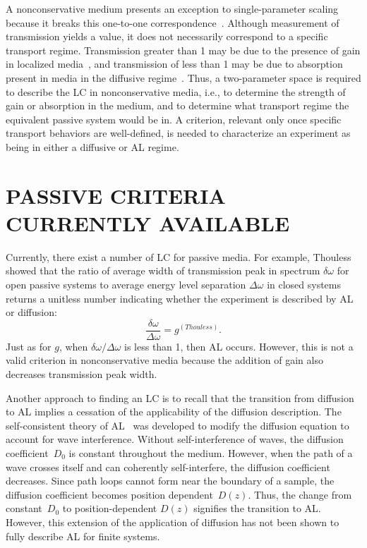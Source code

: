 A nonconservative medium presents an exception to single-parameter scaling because it breaks this one-to-one correspondence~\cite{1994_Freilikher_absorption}. Although measurement of transmission yields a value, it does not necessarily correspond to a specific transport regime. Transmission greater than 1 may be due to the presence of gain in localized media~\cite{2004_Yamilov_intensity,2006_Yamilov_conductance}, and transmission of less than 1 may be due to absorption present in media in the diffusive regime~\cite{2000_chabanov_nature,1998_Brouwer}. Thus, a two-parameter space is required to describe the LC in nonconservative media, i.e., to determine the strength of gain or absorption in the medium, and to determine what transport regime the equivalent passive system would be in. A criterion, relevant only once specific transport behaviors are well-defined, is needed to characterize an experiment as being in either a diffusive or AL regime. 

\section{PASSIVE CRITERIA CURRENTLY AVAILABLE}
\label{sec:passive_criteria}
Currently, there exist a number of LC for passive media. For example, Thouless~\cite{1977_Thouless} showed that the ratio of average width of transmission peak in spectrum $\delta \omega$ for open passive systems to average energy level separation $\Delta \omega$ in closed systems returns a unitless number indicating whether the experiment is described by AL or diffusion:
\begin{equation}
\frac{\delta \omega}{\Delta \omega}= g^{(Thouless)}.
\label{eq:Thouless_passive}
\end{equation}
Just as for $g$, when $\delta \omega/\Delta \omega$ is less than 1, then AL occurs. However, this is not a valid criterion in nonconservative media because the addition of gain also decreases transmission peak width.

Another approach to finding an LC is to recall that the transition from diffusion to AL implies a cessation of the applicability of the diffusion description. The self-consistent theory of AL~\cite{1980_Vollhardt_Wolfle} was developed to modify the diffusion equation to account for wave interference. Without self-interference of waves, the diffusion coefficient~$D_0$ is constant throughout the medium. However, when the path of a wave crosses itself and can coherently self-interfere, the diffusion coefficient decreases. Since path loops cannot form near the boundary of a sample, the diffusion coefficient becomes position dependent~$D(z)$. Thus, the change from constant~$D_0$ to position-dependent $D(z)$ signifies the transition to AL. However, this extension of the application of diffusion has not been shown %
 to fully describe AL for finite systems.

